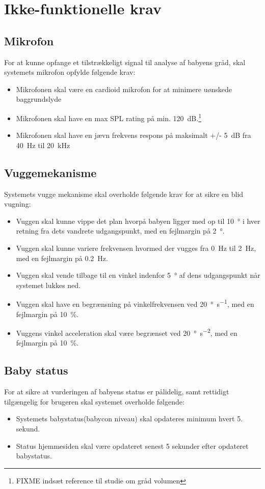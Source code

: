 \section{Ikke-funktionelle krav}

\subsection*{Mikrofon}
For at kunne opfange et tilstrækkeligt signal til analyse af babyens gråd, skal systemets mikrofon opfylde følgende krav:
\begin{itemize}
\item Mikrofonen skal være en cardioid mikrofon for at minimere uønskede baggrundslyde
\item Mikrofonen skal have en max SPL rating på min. \SI{120}{\dB}.\footnote{FIXME indsæt reference til studie om gråd volumen}
\item Mikrofonen skal have en jævn frekvens respons på maksimalt +/- \SI{5}{\dB} fra \SI{40}{\hertz} til \SI{20}{\kilo\hertz}
\end{itemize}

\subsection*{Vuggemekanisme}

Systemets vugge mekanisme skal overholde følgende krav for at sikre en blid vugning:
\begin{itemize}
\item Vuggen skal kunne vippe det plan hvorpå babyen ligger med op til \SI{10}{\degree} i hver retning fra dets vandrete udgangspunkt, med en fejlmargin på \SI{2}{\degree}.
\item Vuggen skal kunne variere frekvensen hvormed der vugges fra \SI{0}{\hertz} til \SI{2}{\hertz}, med en fejlmargin på \SI{0.2}{\hertz}.
\item Vuggen skal vende tilbage til en vinkel indenfor \SI{5}{\degree} af dens udgangspunkt når systemet lukkes ned.
\item Vuggen skal have en begrænsning på vinkelfrekvensen ved \SI{20}{\degree\per\second}, med en fejlmargin på \SI{10}{\percent}.
\item Vuggens vinkel acceleration skal være begrænset ved \SI{20}{\degree\per\square\second}, med en fejlmargin på \SI{10}{\percent}.
\end{itemize}

\subsection*{Baby status}
For at sikre at vurderingen af babyens status er pålidelig, samt rettidigt tilgængelig for brugeren skal systemet overholde følgende:
\begin{itemize}
\item Systemets babystatus(babycon niveau) skal opdateres minimum hvert 5. sekund.
\item Status hjemmesiden skal være opdateret senest 5 sekunder efter opdateret babystatus.
\end{itemize}

